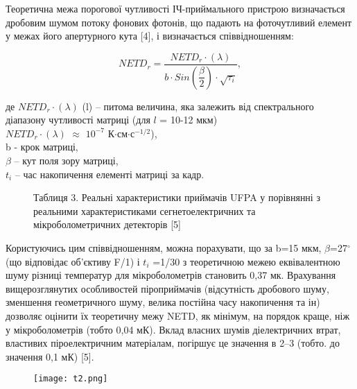 \documentclass[a4paper,14pt]{extreport}
\begin{document}
Теоретична межа порогової чутливості ІЧ-приймального
пристрою визначається дробовим шумом потоку фонових фотонів,
що падають на фоточутливий елемент у межах його апертурного кута [4], і визначається співвідношенням:

\begin{equation}
NETD_r = \dfrac{NETD_r\cdot (\lambda)}{b\cdot Sin(\dfrac{\beta}{2})\cdot \sqrt{\tau_i}},
\end{equation}


де $NETD_r\cdot (\lambda)$
(l) – питома величина, яка залежить від спектрального
діапазону чутливості матриці (для $l$ = 10-12 мкм)\\
$NETD_r\cdot (\lambda)$ $\approx$ $10^{-7}$ К$\cdot$см$\cdot$с$^{-1/2}$),\\ 
b - крок матриці,\\ 
$\beta$ – кут поля зору матриці,\\ 
$t_i$ – час накопичення елементі матриці за кадр.\\ 
\begin{figure}[h!]
Таблиця 3. Реальні характеристики приймачів UFPA у порівнянні
з реальними характеристиками сегнетоелектричних та мікроболометричних детекторів [5]

\label{ris2}
\end{figure}

Користуючись цим співвідношенням, можна порахувати, що за
b=15 мкм, $\beta$=27$^{\circ}$ (що відповідає об'єктиву F/1) і $t_i$ =1/30 з теоретичною межею еквівалентною шуму різниці температур для
мікроболометрів становить 0,37 мк. Врахування вищерозглянутих особливостей піроприймачів (відсутність дробового шуму, зменшення геометричного шуму, велика постійна часу накопичення
та ін) дозволяє оцінити їх теоретичну межу NETD, як мінімум, на порядок краще, ніж у мікроболометрів (тобто  0,04 мК). Вклад
власних шумів діелектричних втрат, властивих піроелектричним матеріалам, погіршує це значення в 2–3 (тобто. до значення  0,1 мК) [5].


\begin{figure}[h!]
\texttt{[image: t2.png]}

\label{ris2}
\end{figure}

\end{document}
